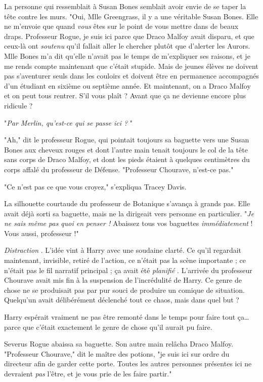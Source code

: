 La personne qui ressemblait à Susan Bones semblait avoir envie de se taper la tête contre les murs. "Oui, Mlle Greengrass, il y a une véritable Susan Bones. Elle ne m'envoie que quand \emph{vous}  êtes sur le point de vous mettre dans de beaux draps. Professeur Rogue, je suis ici parce que Draco Malfoy avait disparu, et que ceux-là ont \emph{soutenu}  qu'il fallait aller le chercher plutôt que d'alerter les Aurors. Mlle Bones m'a dit qu'elle n'avait pas le temps de m'expliquer ses raisons, et je me rends compte maintenant que c'était stupide. Mais de jeunes élèves ne doivent pas s'aventurer seuls dans les couloirs et doivent être en permanence accompagnés d'un étudiant en sixième ou septième année. Et maintenant, on a Draco Malfoy et on peut tous rentrer. S'il vous plaît ? Avant que ça ne devienne encore plus ridicule ?

"\emph{Par Merlin, qu'est-ce qui se passe ici ?} "

"Ah," dit le professeur Rogue, qui pointait toujours sa baguette vers une Susan Bones aux cheveux rouges et dont l'autre main tenait toujours le col de la tête sans corps de Draco Malfoy, et dont les pieds étaient à quelques centimètres du corps affalé du professeur de Défense. "Professeur Chourave, n'est-ce pas."

"Ce n'est pas ce que vous croyez," s'expliqua Tracey Davis.

La silhouette courtaude du professeur de Botanique s'avança à grands pas. Elle avait déjà sorti sa baguette, mais ne la dirigeait vers personne en particulier. "\emph{Je ne sais même pas quoi en penser !}  Abaissez tous vos baguettes \emph{immédiatement}  ! Vous aussi, professeur !"

\emph{Distraction} . L'idée vint à Harry avec une soudaine clarté. Ce qu'il regardait maintenant, invisible, retiré de l'action, ce n'était pas la scène importante ; ce n'était pas le fil narratif principal ; ça avait été \emph{planifié} . L'arrivée du professeur Chourave avait mis fin à la suspension de l'incrédulité de Harry. Ce genre de chose ne se produisait pas par pur souci de produire un comique de situation. Quelqu'un avait délibérément déclenché tout ce chaos, mais dans quel but ?

Harry espérait vraiment ne pas être remonté dans le temps pour faire tout ça… parce que c'était exactement le genre de chose qu'il aurait pu faire.

Severus Rogue abaissa sa baguette. Son autre main relâcha Draco Malfoy. "Professeur Chourave," dit le maître des potions, "je suis ici sur ordre du directeur afin de garder cette porte. Toutes les autres personnes présentes ici ne devraient \emph{pas}  l'être, et je vous prie de les faire partir."

